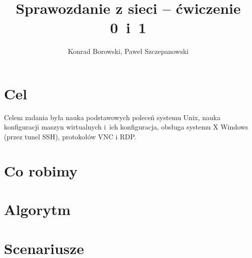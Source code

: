 \documentclass{article}
\title{Sprawozdanie z sieci -- ćwiczenie 0~i~1}
\author{Konrad Borowski, Paweł Szczepanowski}
\begin{document}

\maketitle

\section{Cel}

Celem zadania była nauka podstawowych poleceń systemu Unix, nauka
konfiguracji maszyn wirtualnych i~ich konfiguracja, obsługa systemu
X Windows (przez tunel SSH), protokołów VNC i RDP.

\section{Co robimy}

\section{Algorytm}

\section{Scenariusze}
\end{document}
